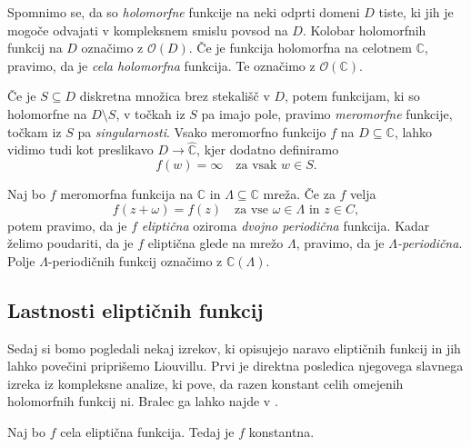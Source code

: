 \documentclass[mat1]{fmfdelo}
\newcommand{\C}{\mathbb C}
\newcommand{\RS}{\widehat{\C}}
\newcommand{\om}{\omega}
\newcommand{\hol}[1]{\mathcal{O}(#1)}
\theoremstyle{definition}
\begin{document}
Spomnimo se, da so \emph{holomorfne} funkcije na neki odprti domeni $D$ tiste, ki jih je mogoče odvajati v kompleksnem smislu povsod na $D$. Kolobar holomorfnih funkcij na $D$ označimo z $\hol{D}$. Če je funkcija holomorfna na celotnem $\C$, pravimo, da je \emph{cela holomorfna} funkcija. Te označimo z $\hol{\C}$.

Če je $S \subseteq D$ diskretna množica brez stekališč v $D$, potem funkcijam, ki so holomorfne na $D \setminus S$, v točkah iz $S$ pa imajo pole, pravimo \emph{meromorfne} funkcije, točkam iz $S$ pa \emph{singularnosti}. Vsako meromorfno funkcijo $f$ na $D \subseteq \C$, lahko vidimo tudi kot preslikavo $D \to \RS$, kjer dodatno definiramo 
\[
    f(w) = \infty \quad \text{za vsak $w \in S$.} 
\]

\begin{definicija}
    Naj bo $f$ meromorfna funkcija na $\C$ in $\Lambda \subseteq \C$ mreža. Če za $f$ velja
    \[
        f(z + \om) = f(z) \quad \text{za vse $\om \in \Lambda$ in $z \in C$},
    \]
    potem pravimo, da je $f$ \emph{eliptična} oziroma \emph{dvojno periodična} funkcija. Kadar želimo poudariti, da je $f$ eliptična glede na mrežo $\Lambda$, pravimo, da je \emph{$\Lambda$-periodična}. Polje $\Lambda$-periodičnih funkcij označimo z $\C(\Lambda)$. %
\end{definicija}





\subsection{Lastnosti eliptičnih funkcij}

Sedaj si bomo pogledali nekaj izrekov, ki opisujejo naravo eliptičnih funkcij in jih lahko povečini priprišemo Liouvillu. Prvi je direktna posledica njegovega slavnega izreka iz kompleksne analize, ki pove, da razen konstant celih omejenih holomorfnih funkcij ni. Bralec ga lahko najde v \cite[]{}.

\begin{izrek}
    \label{cele el. funkcije}
    Naj bo $f$ cela eliptična funkcija. Tedaj je $f$ konstantna.
\end{izrek}
\end{document}
